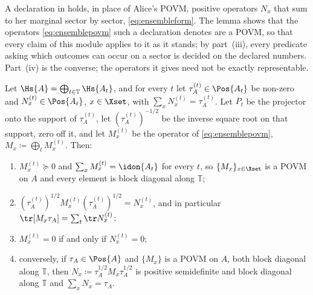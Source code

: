 
A declaration in  holds, in place of Alice's POVM,
positive operators $N_x$ that sum to her marginal sector by sector,
\eqref{eq:ensembleform}. The lemma shows that the operators
\eqref{eq:ensemblepovm} such a declaration denotes are a POVM, so that every
claim of this module applies to it as it stands; by part~(iii), every
predicate asking which outcomes can occur on a sector is decided on the
declared numbers. Part~(iv) is the converse; the operators it gives need not
be exactly representable.

\begin{lemma}\label{lem:ensemble-form}
Let $\Hs{A}=\bigoplus_{t\in\mathbb{T}}\Hs{A_t}$, and for every $t$ let
$\tau^{(t)}_A\in\Pos{A_t}$ be non-zero and $N^{(t)}_x\in\Pos{A_t}$,
$x\in\Xset$, with $\sum_{x}N^{(t)}_x=\tau^{(t)}_A$. Let $P_t$ be the
projector onto the support of $\tau^{(t)}_A$, let
$(\tau^{(t)}_A)^{-1/2}$ be the inverse square root on that support, zero off
it, and let $M^{(t)}_x$ be the operator of \eqref{eq:ensemblepovm},
$M_x\coloneqq\bigoplus_tM^{(t)}_x$. Then:
\begin{enumerate}[label=(\roman*),leftmargin=2.2em]
\item $M^{(t)}_x\succeq0$ and $\sum_xM^{(t)}_x=\idon{A_t}$ for every $t$, so
$\{M_x\}_{x\in\Xset}$ is a POVM on $A$ and every element is block diagonal
along $\mathbb{T}$;
\item $(\tau^{(t)}_A)^{1/2}M^{(t)}_x(\tau^{(t)}_A)^{1/2}=N^{(t)}_x$, and in
particular $\tr[M_x\tau_A]=\sum_t\tr N^{(t)}_x$;
\item $M^{(t)}_x=0$ if and only if $N^{(t)}_x=0$;
\item conversely, if $\tau_A\in\Pos{A}$ and $\{M_x\}$ is a POVM on $A$, both
block diagonal along $\mathbb{T}$, then
$N_x\coloneqq\tau_A^{1/2}M_x\tau_A^{1/2}$ is positive semidefinite and block
diagonal along $\mathbb{T}$ and $\sum_xN_x=\tau_A$.
\end{enumerate}
\end{lemma}

